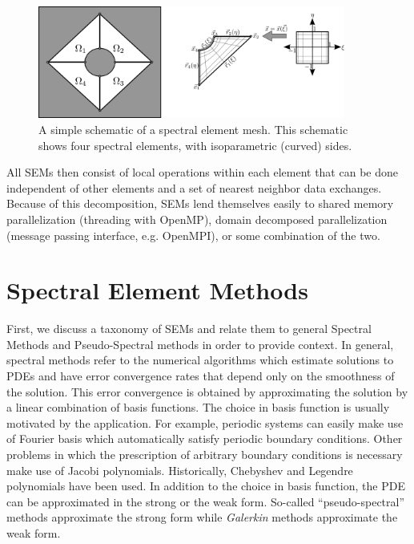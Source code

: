 \documentclass[12pt]{softwaremanual}
\begin{document}
\begin{figure}
\begin{center}
   \includegraphics[width=0.9\textwidth]{figures/geometry/meshDepiction2D-simple.png}
   \caption{A simple schematic of a spectral element mesh. This schematic shows four spectral elements, with isoparametric (curved) sides. }\label{fig:simplemesh}
\end{center}
\end{figure} 
 
 All SEMs then consist of local operations within each element that can be done independent of other elements and a set of nearest neighbor data exchanges. Because of this decomposition, SEMs lend themselves easily to shared memory parallelization (threading with OpenMP), domain decomposed parallelization (message passing interface, e.g. OpenMPI), or some combination of the two.
 
 
\section{Spectral Element Methods} 
First, we discuss a taxonomy of SEMs and relate them to general Spectral Methods and Pseudo-Spectral methods in order to provide context. In general, spectral methods refer to the numerical algorithms which estimate solutions to PDEs and have error convergence rates that depend only on the smoothness of the solution. This error convergence is obtained by approximating the solution by a linear combination of basis functions. The choice in basis function is usually motivated by the application. For example, periodic systems can easily make use of Fourier basis which automatically satisfy periodic boundary conditions. Other problems in which the prescription of arbitrary boundary conditions is necessary make use of Jacobi polynomials. Historically, Chebyshev and Legendre polynomials have been used. In addition to the choice in basis function, the PDE can be approximated in the strong or the weak form. So-called ``pseudo-spectral'' methods approximate the strong form while \textit{Galerkin} methods approximate the weak form. 
\end{document}
